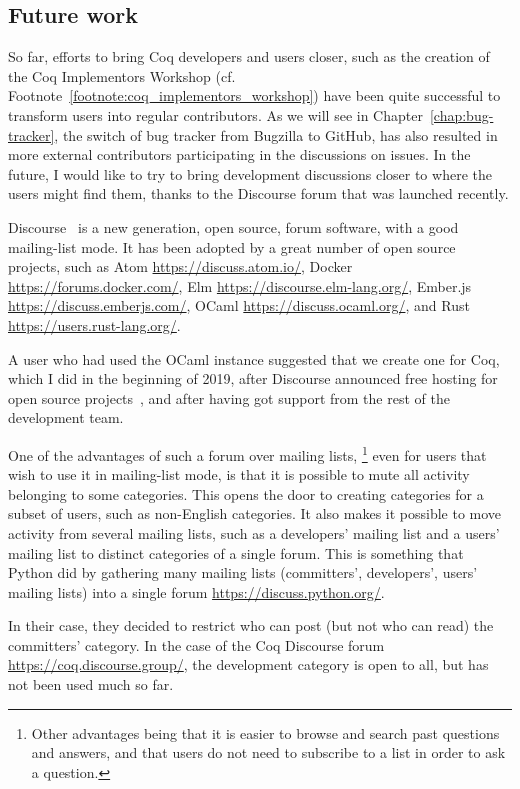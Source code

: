 \subsection{Future work}

So far, efforts to bring Coq developers and users closer, such as the creation of the Coq Implementors Workshop (cf. Footnote~\ref{footnote:coq_implementors_workshop}) have been quite successful to transform users into regular contributors.
As we will see in Chapter~\ref{chap:bug-tracker}, the switch of bug tracker from Bugzilla to GitHub, has also resulted in more external contributors participating in the discussions on issues.
In the future, I would like to try to bring development discussions closer to where the users might find them, thanks to the Discourse forum that was launched recently.

Discourse~\cite{discourse} is a new generation, open source, forum software, with a good mailing-list mode.
It has been adopted by a great number of open source projects, such as Atom \url{https://discuss.atom.io/}, Docker \url{https://forums.docker.com/}, Elm \url{https://discourse.elm-lang.org/}, Ember.js \url{https://discuss.emberjs.com/}, OCaml \url{https://discuss.ocaml.org/}, and Rust \url{https://users.rust-lang.org/}.

A user who had used the OCaml instance suggested that we create one for Coq, which I did in the beginning of 2019, after Discourse announced free hosting for open source projects~\cite{discourse2018free}, and after having got support from the rest of the development team.

One of the advantages of such a forum over mailing lists,%
\footnote{
	Other advantages being that it is easier to browse and search past questions and answers, and that users do not need to subscribe to a list in order to ask a question.
}
even for users that wish to use it in mailing-list mode, is that it is possible to mute all activity belonging to some categories.
This opens the door to creating categories for a subset of users, such as non-English categories.
It also makes it possible to move activity from several mailing lists, such as a developers' mailing list and a users' mailing list to distinct categories of a single forum.
This is something that Python did by gathering many mailing lists (committers', developers', users' mailing lists) into a single forum \url{https://discuss.python.org/}.

In their case, they decided to restrict who can post (but not who can read) the committers' category.
In the case of the Coq Discourse forum \url{https://coq.discourse.group/}, the development category is open to all, but has not been used much so far.


